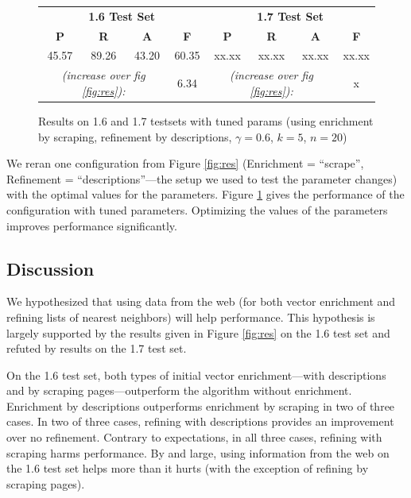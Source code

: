 \documentclass{article}
\begin{document}
\begin{figure}[htbp]
\begin{center}
\begin{tabular}{|c|c|c|c||c|c|c|c|}
\hline
  \multicolumn{4}{|c||}{{\bf 1.6 Test Set}} & \multicolumn{4}{c|}{{\bf 1.7 Test Set}}  \\
  {\bf P} & {\bf R} & {\bf A} & {\bf F} & {\bf P} & {\bf R} & {\bf A} & {\bf F} \\
\hline \hline
45.57 & 89.26 & 43.20 & 60.35 & xx.xx & xx.xx & xx.xx & xx.xx \\
\hline
\multicolumn{3}{|c|}{{\it (increase over fig \ref{fig:res}):}} & 6.34 & \multicolumn{3}{c|}{{\it (increase over fig \ref{fig:res}):}}  & x  \\
\hline
\end{tabular}
\caption{Results on 1.6 and 1.7 testsets with tuned params (using enrichment by scraping, refinement by descriptions, $\gamma=0.6$, $k=5$, $n=20$)}
\label{fig:tunedres}
\end{center}
\end{figure}
We  reran one configuration from Figure \ref{fig:res} (Enrichment = ``scrape'', Refinement = ``descriptions''---the setup we used to test the parameter changes) with the optimal values for the parameters.
Figure \ref{fig:tunedres} gives the performance of the configuration with tuned parameters.
Optimizing the values of the parameters improves performance significantly.


\subsection{Discussion}


We hypothesized that using data from the web (for both vector enrichment and refining lists of nearest neighbors) will help performance.
This hypothesis is largely supported by the results given in Figure \ref{fig:res} on the 1.6 test set and refuted by results on the 1.7 test set.

On the 1.6 test set, both types of initial vector enrichment---with descriptions and by scraping pages---outperform the algorithm without enrichment.
Enrichment by descriptions outperforms enrichment by scraping in two of three cases.
In two of three cases, refining with descriptions provides an improvement over no refinement.
Contrary to expectations, in all three cases, refining with scraping harms performance.
By and large, using information from the web on the 1.6 test set helps more than it hurts (with the exception of refining by scraping pages).
\end{document}
